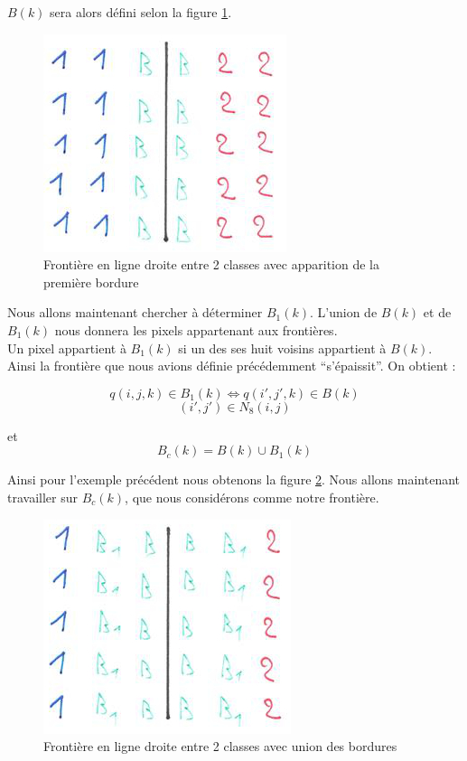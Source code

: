 	$B(k)$ sera alors défini selon la figure \ref{fig:bordure2}.\\
	\begin{figure}[H]
		\centering
		\includegraphics[scale=0.75]{images/bordure-2.jpg}
		\caption{Frontière en ligne droite entre 2 classes avec apparition de la première bordure}
		\label{fig:bordure2}
	\end{figure}

	Nous allons maintenant chercher à déterminer $B_1(k)$. L'union de $B(k)$ et de $B_1(k)$ nous donnera les pixels appartenant aux frontières.\\

	Un pixel appartient à $B_1(k)$ si un des ses huit voisins appartient à $B(k)$. Ainsi la frontière que nous avions définie précédemment \enquote{s'épaissit}. On obtient :

	\[ q(i,j,k) \in B_1(k) \Leftrightarrow q(i',j',k) \in B(k) \]
	\[ (i',j') \in N_8(i,j) \]

	et \[ B_c(k) = B(k) \cup B_1(k) \]

	Ainsi pour l'exemple précédent nous obtenons la figure \ref{fig:bordure3}. Nous allons maintenant travailler sur $B_c(k)$, que nous considérons comme notre frontière.

	\begin{figure}[H]
		\centering
		\includegraphics[scale=0.75]{images/bordure-3.jpg}
		\caption{Frontière en ligne droite entre 2 classes avec union des bordures}
		\label{fig:bordure3}
	\end{figure}

